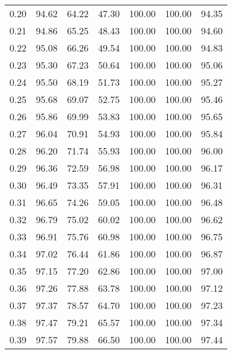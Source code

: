 \begin{tabular}{|c|c|c|c|c|c|c|}
      0.20 &     94.62 &     64.22 &      47.30 &  100.00 &     100.00 &         94.35 \\
      0.21 &     94.86 &     65.25 &      48.43 &  100.00 &     100.00 &         94.60 \\
      0.22 &     95.08 &     66.26 &      49.54 &  100.00 &     100.00 &         94.83 \\
      0.23 &     95.30 &     67.23 &      50.64 &  100.00 &     100.00 &         95.06 \\
      0.24 &     95.50 &     68.19 &      51.73 &  100.00 &     100.00 &         95.27 \\
      0.25 &     95.68 &     69.07 &      52.75 &  100.00 &     100.00 &         95.46 \\
      0.26 &     95.86 &     69.99 &      53.83 &  100.00 &     100.00 &         95.65 \\
      0.27 &     96.04 &     70.91 &      54.93 &  100.00 &     100.00 &         95.84 \\
      0.28 &     96.20 &     71.74 &      55.93 &  100.00 &     100.00 &         96.00 \\
      0.29 &     96.36 &     72.59 &      56.98 &  100.00 &     100.00 &         96.17 \\
      0.30 &     96.49 &     73.35 &      57.91 &  100.00 &     100.00 &         96.31 \\
      0.31 &     96.65 &     74.26 &      59.05 &  100.00 &     100.00 &         96.48 \\
      0.32 &     96.79 &     75.02 &      60.02 &  100.00 &     100.00 &         96.62 \\
      0.33 &     96.91 &     75.76 &      60.98 &  100.00 &     100.00 &         96.75 \\
      0.34 &     97.02 &     76.44 &      61.86 &  100.00 &     100.00 &         96.87 \\
      0.35 &     97.15 &     77.20 &      62.86 &  100.00 &     100.00 &         97.00 \\
      0.36 &     97.26 &     77.88 &      63.78 &  100.00 &     100.00 &         97.12 \\
      0.37 &     97.37 &     78.57 &      64.70 &  100.00 &     100.00 &         97.23 \\
      0.38 &     97.47 &     79.21 &      65.57 &  100.00 &     100.00 &         97.34 \\
      0.39 &     97.57 &     79.88 &      66.50 &  100.00 &     100.00 &         97.44 \\

\end{tabular}
